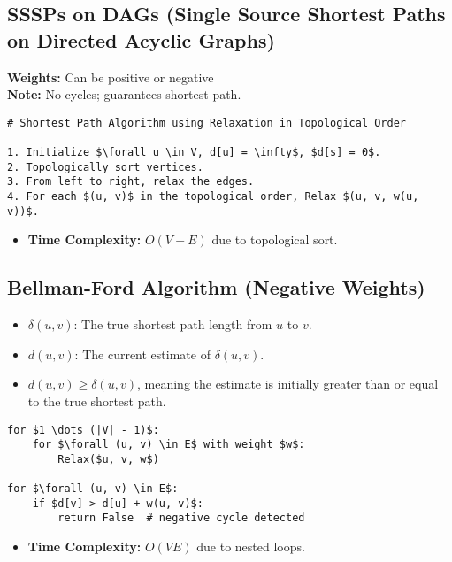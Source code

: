 \subsection{SSSPs on DAGs (Single Source Shortest Paths on Directed Acyclic Graphs)}
\begin{definition}
    \textbf{Weights:} Can be positive or negative \\
    \textbf{Note:} No cycles; guarantees shortest path.


\begin{lstlisting}[mathescape=true]
# Shortest Path Algorithm using Relaxation in Topological Order

1. Initialize $\forall u \in V, d[u] = \infty$, $d[s] = 0$.
2. Topologically sort vertices.
3. From left to right, relax the edges.
4. For each $(u, v)$ in the topological order, Relax $(u, v, w(u, v))$.
\end{lstlisting}
\begin{itemize}
    \item \textbf{Time Complexity:} \( O(V + E) \) due to topological sort.
\end{itemize}
\end{definition}

\subsection{Bellman-Ford Algorithm (Negative Weights)}
\begin{summary}
    \begin{itemize}
        \item \( \delta(u, v) \): The true shortest path length from \( u \) to \( v \).
        \item \( d(u, v) \): The current estimate of \( \delta(u, v) \).
        \item \( d(u, v) \geq \delta(u, v) \), meaning the estimate is initially greater than or equal to the true shortest path.
    \end{itemize}        
\end{summary}

\begin{definition}
\begin{lstlisting}[mathescape=true]
for $1 \dots (|V| - 1)$:
    for $\forall (u, v) \in E$ with weight $w$:
        Relax($u, v, w$)

for $\forall (u, v) \in E$:
    if $d[v] > d[u] + w(u, v)$:
        return False  # negative cycle detected
\end{lstlisting} 
\begin{itemize}
    \item \textbf{Time Complexity:} \( O(VE) \) due to nested loops.
\end{itemize}
\end{definition}

